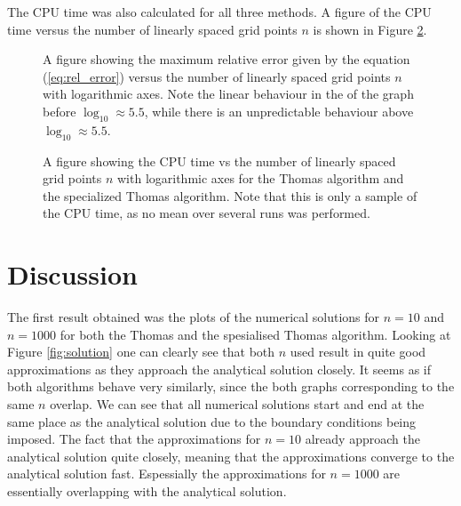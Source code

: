 \documentclass[twocolumn]{aastex62}
\begin{document}
The CPU time was also calculated for all three methods. A figure of the CPU time versus the number of linearly spaced grid points $n$ is shown in Figure \ref{fig:CPUtimeplot}.

\begin{figure}[ht]
	\caption{A figure showing the maximum relative error given by the equation (\ref{eq:rel_error}) versus the number of linearly spaced grid points $n$ with logarithmic axes. Note the linear behaviour in the of the graph before $\log_{10} \approx 5.5$, while there is an unpredictable behaviour above $\log_{10} \approx 5.5$.} 
	\label{fig:specerror}
\end{figure}

\begin{figure}[ht]
	\caption{A figure showing the CPU time vs the number of linearly spaced grid points $n$ with logarithmic axes for the Thomas algorithm and the specialized Thomas algorithm. Note that this is only a sample of the CPU time, as no mean over several runs was performed.}	\label{fig:CPUtimeplot}
\end{figure}

\section{Discussion} \label{sec:discussion}
The first result obtained was the plots of the numerical solutions for $n=10$ and $n = 1000$ for both the Thomas and the spesialised Thomas algorithm. Looking at Figure \ref{fig:solution} one can clearly see that both $n$ used result in quite good approximations as they approach the analytical solution closely. It seems as if both algorithms behave very similarly, since the both graphs corresponding to the same $n$ overlap. We can see that all numerical solutions start and end at the same place as the analytical solution due to the boundary conditions being imposed. The fact that the approximations for $n=10$  already approach the analytical solution quite closely, meaning that the approximations converge to the analytical solution fast. Espessially the approximations for $n=1000$ are essentially overlapping with the analytical solution.
\end{document}
